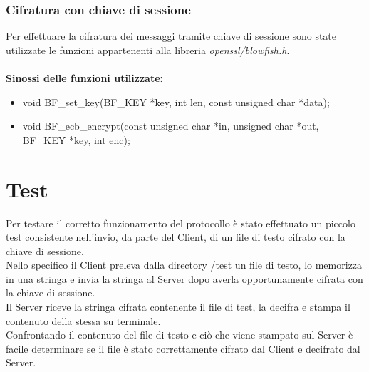 \documentclass[12pt, a4paper]{article}
\begin{document}
\subsubsection{Cifratura con chiave di sessione}
Per effettuare la cifratura dei messaggi tramite chiave di sessione sono state utilizzate le funzioni appartenenti alla libreria \textit{openssl/blowfish.h}.\\\\
\textbf{Sinossi delle funzioni utilizzate:}
\begin{itemize}
\item 
void BF\_set\_key(BF\_KEY *key, int len, const unsigned char *data);
\item
void BF\_ecb\_encrypt(const unsigned char *in, unsigned char *out, BF\_KEY *key, int enc);
\end{itemize}
\newpage
\section{Test}
Per testare il corretto funzionamento del protocollo è stato effettuato un piccolo test consistente nell'invio, da parte del Client, di un file di testo cifrato con la chiave di sessione.\\
Nello specifico il Client preleva dalla directory /test un file di testo, lo memorizza in una stringa e invia la stringa al Server dopo averla opportunamente cifrata con la chiave di sessione.\\
Il Server riceve la stringa cifrata contenente il file di test, la decifra e stampa il contenuto della stessa su terminale.\\
Confrontando il contenuto del file di testo e ciò che viene stampato sul Server è facile determinare se il file è stato correttamente cifrato dal Client e decifrato dal Server.
\newpage
\end{document}
